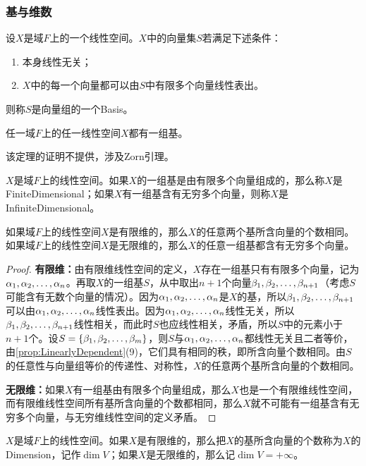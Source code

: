 \subsubsection{基与维数}
\begin{definition}
	设$X$是域$F$上的一个线性空间。$X$中的向量集$S$若满足下述条件：
	\begin{enumerate}
		\item 本身线性无关；
		\item $X$中的每一个向量都可以由$S$中有限多个向量线性表出。
	\end{enumerate}
	则称$S$是向量组的一个\gls{Basis}。
\end{definition}
\begin{theorem}\label{theo:ExistenceOfBasis}
	任一域$F$上的任一线性空间$X$都有一组基。
\end{theorem}
该定理的证明不提供，涉及Zorn引理。
\begin{definition}
	$X$是域$F$上的线性空间。如果$X$的一组基是由有限多个向量组成的，那么称$X$是\gls{FiniteDimensional}；如果$X$有一组基含有无穷多个向量，则称$X$是\gls{InfiniteDimensional}。
\end{definition}
\begin{theorem}\label{theo:NOfBasisVector}
	如果域$F$上的线性空间$X$是有限维的，那么$X$的任意两个基所含向量的个数相同。如果域$F$上的线性空间$X$是无限维的，那么$X$的任意一组基都含有无穷多个向量。
\end{theorem}
\begin{proof}
	\textbf{有限维：}由有限维线性空间的定义，$X$存在一组基只有有限多个向量，记为$\alpha_1, \alpha_2, \dots, \alpha_{n}$。再取$X$的一组基$S$，从中取出$n+1$个向量$\beta_1, \beta_2, \dots, \beta_{n+1}$（考虑$S$可能含有无数个向量的情况）。因为$\alpha_1, \alpha_2, \dots, \alpha_{n}$是$X$的基，所以$\beta_1, \beta_2, \dots, \beta_{n+1}$可以由$\alpha_1, \alpha_2, \dots, \alpha_{n}$线性表出。因为$\alpha_1, \alpha_2, \dots, \alpha_{n}$线性无关，所以$\beta_1, \beta_2, \dots, \beta_{n+1}$线性相关，而此时$S$也应线性相关，矛盾，所以$S$中的元素小于$n+1$个。设$S=\{\beta_1, \beta_2, \dots, \beta_{m}\}$，则$S$与$\alpha_1, \alpha_2, \dots, \alpha_{n}$都线性无关且二者等价，由\cref{prop:LinearlyDependent}(9)，它们具有相同的秩，即所含向量个数相同。由$S$的任意性与向量组等价的传递性、对称性，$X$的任意两个基所含向量的个数相同。\par
	\textbf{无限维：}如果$X$有一组基由有限多个向量组成，那么$X$也是一个有限维线性空间，而有限维线性空间所有基所含向量的个数都相同，那么$X$就不可能有一组基含有无穷多个向量，与无穷维线性空间的定义矛盾。
\end{proof}
\begin{definition}
	$X$是域$F$上的线性空间。如果$X$是有限维的，那么把$X$的基所含向量的个数称为$X$的\gls{Dimension}，记作$\operatorname{dim}V$；如果$X$是无限维的，那么记$\dim V=+\infty$。
\end{definition}
